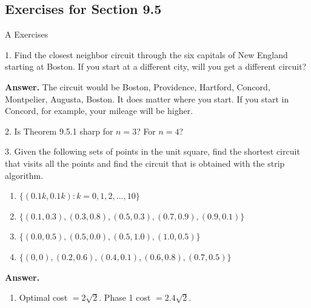 \documentclass[10pt,]{book}
\theoremstyle{plain}
\theoremstyle{definition}
\theoremstyle{definition}
\theoremstyle{definition}
\theoremstyle{definition}
\theoremstyle{definition}
\numberwithin{equation}{section}
\begin{document}
\subsection[Exercises for Section 9.5]{Exercises for Section 9.5}\label{exercises-9-5}
\hypertarget{exercisegroup-7}{}\typeout{************************************************}
\typeout{************************************************}
A Exercises%
\begin{exercisegroup}
\item[1.]\hypertarget{exercise-31}{} Find the closest neighbor circuit through the six capitals of New England starting at Boston. If you start at a different city, will you get a different circuit?%
\par\smallskip
\par\smallskip
\noindent\textbf{Answer.}\hypertarget{answer-11}{}\quad
 The circuit would be Boston, Providence, Hartford, Concord, Montpelier, Augusta, Boston. It does matter where you start. If you start in Concord,
for example, your mileage will be higher.%
\item[2.]\hypertarget{exercise-32}{} Is Theorem 9.5.1 sharp for \(n = 3\)? For \(n = 4\)?%
\par\smallskip
\item[3.]\hypertarget{exercise-33}{} Given the following sets of points in the unit square, find the shortest circuit that visits all the points and find the circuit that is obtained
with the strip algorithm.%
\par
\leavevmode%
\begin{enumerate}[label=\alph*]
\item\hypertarget{li-102}{} \(\{(0.1k, 0.1k) : k = 0, 1, 2, . . . , 10\}\)%
\item\hypertarget{li-103}{} \(\{(0.1, 0.3), (0.3, 0.8), (0.5, 0.3), (0.7, 0.9), (0.9, 0.1)\}\)%
\item\hypertarget{li-104}{} \(\{(0.0, 0.5), (0.5, 0.0), (0.5, 1.0), (1.0, 0.5)\}\)%
\item\hypertarget{li-105}{} \(\{(0, 0), (0.2, 0.6), (0.4, 0.1), (0.6, 0.8), (0.7, 0.5)\}\)%
\end{enumerate}
%
\par\smallskip
\par\smallskip
\noindent\textbf{Answer.}\hypertarget{answer-12}{}\quad
\leavevmode%
\begin{enumerate}[label=\alph*]
\item\hypertarget{li-106}{} Optimal cost \(=2\sqrt{2}\).
Phase 1 cost \(=2.4\sqrt{2}\).

\end{enumerate}
\end{exercisegroup}
\end{document}

